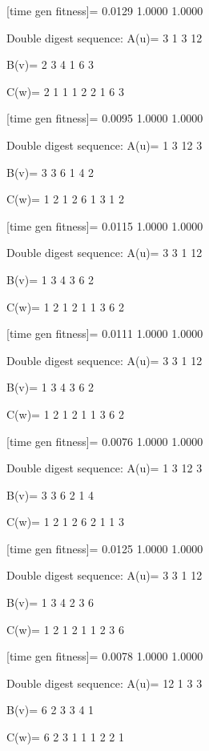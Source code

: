 [time gen fitness]=
    0.0129    1.0000    1.0000

Double digest sequence:
A(u)=
     3     1     3    12

B(v)=
     2     3     4     1     6     3

C(w)=
     2     1     1     1     2     2     1     6     3

[time gen fitness]=
    0.0095    1.0000    1.0000

Double digest sequence:
A(u)=
     1     3    12     3

B(v)=
     3     3     6     1     4     2

C(w)=
     1     2     1     2     6     1     3     1     2

[time gen fitness]=
    0.0115    1.0000    1.0000

Double digest sequence:
A(u)=
     3     3     1    12

B(v)=
     1     3     4     3     6     2

C(w)=
     1     2     1     2     1     1     3     6     2

[time gen fitness]=
    0.0111    1.0000    1.0000

Double digest sequence:
A(u)=
     3     3     1    12

B(v)=
     1     3     4     3     6     2

C(w)=
     1     2     1     2     1     1     3     6     2

[time gen fitness]=
    0.0076    1.0000    1.0000

Double digest sequence:
A(u)=
     1     3    12     3

B(v)=
     3     3     6     2     1     4

C(w)=
     1     2     1     2     6     2     1     1     3

[time gen fitness]=
    0.0125    1.0000    1.0000

Double digest sequence:
A(u)=
     3     3     1    12

B(v)=
     1     3     4     2     3     6

C(w)=
     1     2     1     2     1     1     2     3     6

[time gen fitness]=
    0.0078    1.0000    1.0000

Double digest sequence:
A(u)=
    12     1     3     3

B(v)=
     6     2     3     3     4     1

C(w)=
     6     2     3     1     1     1     2     2     1

